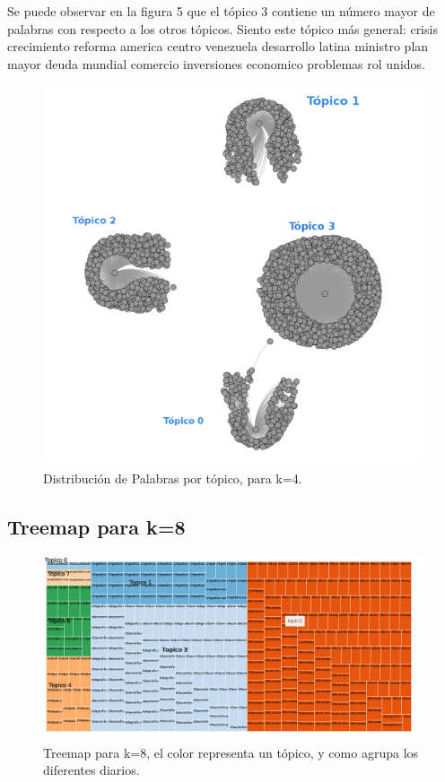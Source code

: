 \documentclass[8.5pt,twoside,twocolumn]{article}
\begin{document}
Se puede observar en la figura 5 que el t\'opico 3 contiene un n\'umero mayor de palabras con respecto a los otros t\'opicos.
Siento este t\'opico m\'as general: crisis crecimiento reforma america centro venezuela desarrollo latina 
ministro plan mayor deuda mundial comercio inversiones economico problemas rol unidos.

\begin{figure}[h]
  \centering
  \includegraphics[scale=0.2]{topics_words_4_10_txt.png}
  \caption{Distribuci\'on de Palabras por t\'opico, para k=4.}  
  \label{fgr:perplexity}
\end{figure}

\subsection{ Treemap para k=8  }

\begin{figure}[h]
  \centering
  \includegraphics[scale=0.2]{tremap_k8_5_P0_998_unigram.png}
  \caption{Treemap para k=8, el color representa un t\'opico, y como agrupa los diferentes diarios.}  
  \label{fgr:treemap}
\end{figure}
\end{document}
